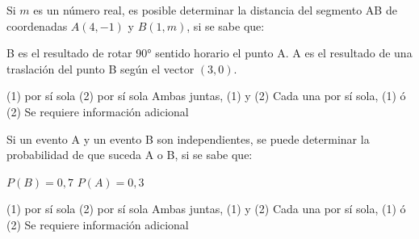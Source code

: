 \documentclass[sin nombre]{srs}
\begin{document}
\begin{preguntas}[after-item-skip=1cm]
\pregunta Si $m$ es un número real, es posible determinar la distancia del segmento AB de coordenadas $A(4,-1)$ y $B(1,m)$, si se sabe que:
\begin{verticaln}
\alternativa B es el resultado de rotar 90° sentido horario el punto A.
\alternativa A es el resultado de una traslación del punto B según el vector $(3,0)$.
\end{verticaln}
\begin{vertical}
\alternativa (1) por sí sola
\alternativa (2) por sí sola
\alternativa Ambas juntas, (1) y (2)
\alternativa Cada una por sí sola, (1) ó (2)
\alternativa Se requiere información adicional
\end{vertical}

\pregunta Si un evento A y un evento B son independientes, se puede determinar la probabilidad de que suceda A o B, si se sabe que:
\begin{verticaln}
\alternativa $P(B)=0,7$
\alternativa $P(A)=0,3$
\end{verticaln}
\begin{vertical}
\alternativa (1) por sí sola
\alternativa (2) por sí sola
\alternativa Ambas juntas, (1) y (2)
\alternativa Cada una por sí sola, (1) ó (2)
\alternativa Se requiere información adicional
\end{vertical}

\end{preguntas}
\end{document}
